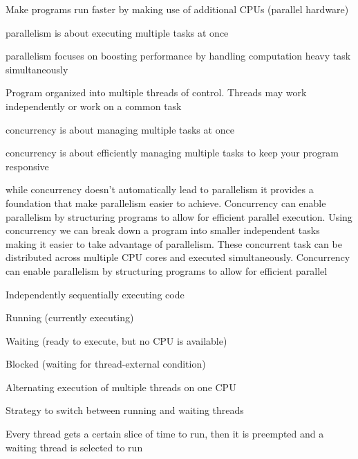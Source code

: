 \documentclass[landscape, a4paper]{article}
\begin{document}
\begin{minipage}[t]{0.2\linewidth}
\begin{betterlist}
\begin{betterlist}
			\item {} Make programs run faster by making use of additional CPUs (parallel hardware)
			\begin{betterlist}
				\item parallelism is about executing multiple tasks at once
				\item parallelism focuses on boosting performance by handling computation heavy task simultaneously
			\end{betterlist}
			\item {} Program organized into multiple threads of control. Threads may work independently or work on a common task
			\begin{betterlist}
				\item concurrency is about managing multiple tasks at once
				\item concurrency is about efficiently managing multiple tasks to keep your program responsive
			\end{betterlist}
			\item while concurrency doesn't automatically lead to parallelism it provides a foundation that make parallelism easier to achieve. Concurrency can enable parallelism by structuring programs to allow for efficient parallel execution. Using concurrency we can break down a program into smaller independent tasks making it easier to take advantage of parallelism. These concurrent task can be distributed across multiple CPU cores and executed simultaneously. Concurrency can enable parallelism by structuring programs to allow for efficient parallel
		\end{betterlist}
		\item {} Independently sequentially executing code
		\item {}
		\begin{betterlist}
			\item Running (currently executing)
			\item Waiting (ready to execute, but no CPU is available)
			\item Blocked (waiting for thread-external condition)
		\end{betterlist}
		\item {} Alternating execution of multiple threads on one CPU
		\item {} Strategy to switch between running and waiting threads
		\begin{betterlist}
			\item {} Every thread gets a certain slice of time to run, then it is preempted and a waiting thread is selected to run

\end{betterlist}
\end{betterlist}
\end{minipage}
\end{document}

